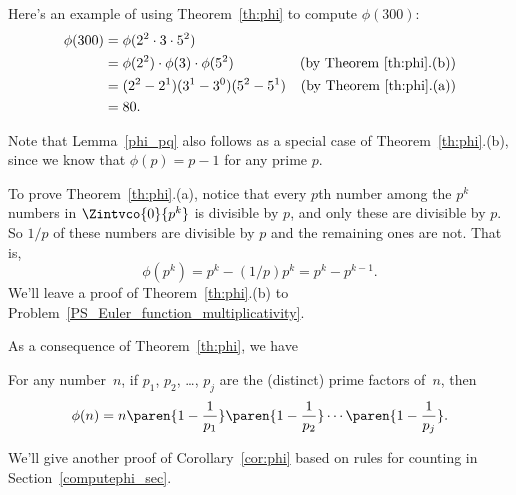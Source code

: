Here's an example of using Theorem~\ref{th:phi} to compute $\phi(300)$:
\begin{align*}
\phi(300) & = \phi(2^2 \cdot 3 \cdot 5^2)\\
& = \phi(2^2) \cdot \phi(3) \cdot \phi(5^2) &
\text{(by Theorem~\ref{th:phi}.(b))}\\
& = (2^2 - 2^1) (3^1 - 3^0) (5^2 - 5^1) & \text{(by
  Theorem~\ref{th:phi}.(a))}\\
& = 80.
\end{align*}

Note that Lemma~\ref{phi_pq} also follows as a special case of
Theorem~\ref{th:phi}.(b), since we know that $\phi(p) = p-1$ for any
prime $p$.

To prove Theorem~\ref{th:phi}.(a), notice that every $p$th number among the $p^k$ numbers
in $\Zintvco{0}{p^{k}}$ is divisible by $p$, and only these are divisible by $p$.  So $1/p$ of
  these numbers are divisible by $p$ and the remaining ones are not.  That is,
\[
\phi(p^{k}) = p^k - (1/p)p^k = p^k -p^{k-1}.
\]
We'll leave a proof of Theorem~\ref{th:phi}.(b) to
Problem~\ref{PS_Euler_function_multiplicativity}.

As a consequence of Theorem~\ref{th:phi}, we have
\begin{corollary}\label{cor:phi}
For any number~$n$, if $p_1$, $p_2$, \dots, $p_j$ are the (distinct)
prime factors of~$n$, then
\begin{equation*}
    \phi(n) = n \paren{1 - \frac{1}{p_1}} \paren{1 - \frac{1}{p_2}} \cdots \paren{1 -
      \frac{1}{p_j}}.
 \end{equation*}
\end{corollary}
We'll give another proof of Corollary~\ref{cor:phi} based on rules for
counting in Section~\ref{computephi_sec}.

\iffalse are all those of the form $mp$.  For $mp$ to be in the interval, $m$ can take any
value from 0 to $p^{k-1}-1$ and no others, so there are exactly $p^{k-1}$ numbers in the
interval that are divisible by $p$.  Now $\phi(p^{k})$ equals the number of remaining
elements in the interval, namely, $p^k -p^{k-1}$.  \fi

